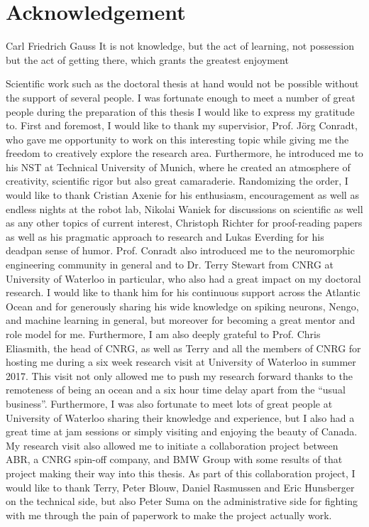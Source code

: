 \chapter*{Acknowledgement}
\begin{chapquote}{Carl Friedrich Gauss}
It is not knowledge, but the act of learning, not possession but the act of getting there, which grants the greatest enjoyment
\end{chapquote}

Scientific work such as the doctoral thesis at hand would not be possible without the support of several people.
I was fortunate enough to meet a number of great people during the preparation of this thesis I would like to express my gratitude to.
First and foremost, I would like to thank my supervisior, Prof. J\"org Conradt, who gave me opportunity to work on this interesting topic while giving me the freedom to creatively explore the research area.
Furthermore, he introduced me to his \acl{NST} at Technical University of Munich, where he created an atmosphere of creativity, scientific rigor but also great camaraderie.
Randomizing the order, I would like to thank Cristian Axenie for his enthusiasm, encouragement as well as endless nights at the robot lab, Nikolai Waniek for discussions on scientific as well as any other topics of current interest, Christoph Richter for proof-reading papers as well as his pragmatic approach to research and Lukas Everding for his deadpan sense of humor.
Prof. Conradt also introduced me to the neuromorphic engineering community in general and to Dr. Terry Stewart from \ac{CNRG} at University of Waterloo in particular, who also had a great impact on my doctoral research.
I would like to thank him for his continuous support across the Atlantic Ocean and for generously sharing his wide knowledge on spiking neurons, Nengo, and machine learning in general, but moreover for becoming a great mentor and role model for me.
Furthermore, I am also deeply grateful to Prof. Chris Eliasmith, the head of \ac{CNRG}, as well as Terry and all the members of \ac{CNRG} for hosting me during a six week research visit at University of Waterloo in summer 2017.
This visit not only allowed me to push my research forward thanks to the remoteness of being an ocean and a six hour time delay apart from the \enquote{usual business}.
Furthermore, I was also fortunate to meet lots of great people at University of Waterloo sharing their knowledge and experience, but I also had a great time at jam sessions or simply visiting and enjoying the beauty of Canada.
My research visit also allowed me to initiate a collaboration project between \ac{ABR}, a \ac{CNRG} spin-off company, and BMW Group with some results of that project making their way into this thesis.
As part of this collaboration project, I would like to thank Terry, Peter Blouw, Daniel Rasmussen and Eric Hunsberger on the technical side, but also Peter Suma on the administrative side for fighting with me through the pain of paperwork to make the project actually work.

